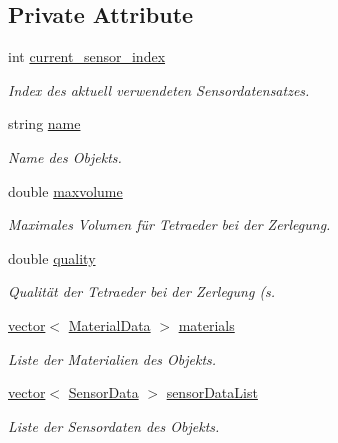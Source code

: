 \subsection*{Private Attribute}
\begin{DoxyCompactItemize}
\item 
int \hyperlink{classObjectData_a86976d7029456ac75a3e011f11e8c5f7}{current\-\_\-sensor\-\_\-index}
\begin{DoxyCompactList}\small\item\em Index des aktuell verwendeten Sensordatensatzes. \end{DoxyCompactList}\item 
string \hyperlink{classObjectData_a6d900f11952e9d50e6660a3695fad99d}{name}
\begin{DoxyCompactList}\small\item\em Name des Objekts. \end{DoxyCompactList}\item 
double \hyperlink{classObjectData_a5cc67da17022ec0f6eed6d02fa975a8b}{maxvolume}
\begin{DoxyCompactList}\small\item\em Maximales Volumen für Tetraeder bei der Zerlegung. \end{DoxyCompactList}\item 
double \hyperlink{classObjectData_ae047918932000aca3ff1bc680b288c08}{quality}
\begin{DoxyCompactList}\small\item\em Qualität der Tetraeder bei der Zerlegung (s. \end{DoxyCompactList}\item 
\hyperlink{classstd_1_1vector}{vector}$<$ \hyperlink{structObjectData_1_1MaterialData}{Material\-Data} $>$ \hyperlink{classObjectData_a353002eeb054efed800db1b798d08a6c}{materials}
\begin{DoxyCompactList}\small\item\em Liste der Materialien des Objekts. \end{DoxyCompactList}\item 
\hyperlink{classstd_1_1vector}{vector}$<$ \hyperlink{structUtils_1_1SensorData}{Sensor\-Data} $>$ \hyperlink{classObjectData_af6a1dcb4e137b1698422a912c07c7f39}{sensor\-Data\-List}
\begin{DoxyCompactList}\small\item\em Liste der Sensordaten des Objekts. \end{DoxyCompactList}\end{DoxyCompactItemize}



